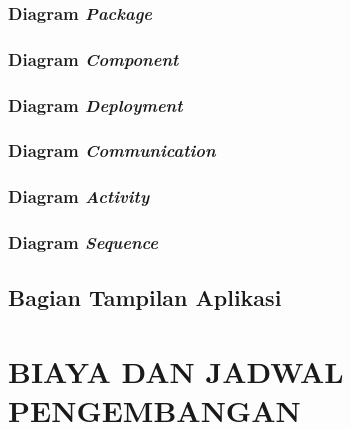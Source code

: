 \documentclass[pdftex,12pt, oneside]{article}
\begin{document}
\subsubsection{Diagram \textit{Package}}

\subsubsection{Diagram \textit{Component}}

\subsubsection{Diagram \textit{Deployment}}

\subsubsection{Diagram \textit{Communication}}


\subsubsection{Diagram \textit{Activity}}

\subsubsection{Diagram \textit{Sequence}}

\subsection{Bagian Tampilan Aplikasi}

\section{BIAYA DAN JADWAL PENGEMBANGAN}
\end{document}

